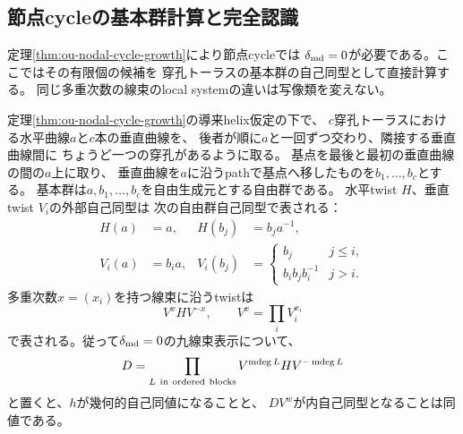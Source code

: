 \subsection{節点cycleの基本群計算と完全認識}
\label{subsec:ou-nodal-free-group}
定理\ref{thm:ou-nodal-cycle-growth}により節点cycleでは
$\delta_{\rm md}=0$が必要である。ここではその有限個の候補を
穿孔トーラスの基本群の自己同型として直接計算する。
同じ多重次数の線束のlocal systemの違いは写像類を変えない。

\begin{proposition}[基本群による幾何性の判定]
\label{prop:ou-nodal-free-group}
定理\ref{thm:ou-nodal-cycle-growth}の導来helix仮定の下で、
$c$穿孔トーラスにおける水平曲線$a$と$c$本の垂直曲線を、
後者が順に$a$と一回ずつ交わり、隣接する垂直曲線間に
ちょうど一つの穿孔があるように取る。
基点を最後と最初の垂直曲線の間の$a$上に取り、
垂直曲線を$a$に沿うpathで基点へ移したものを$b_1,\ldots,b_c$とする。
基本群は$a,b_1,\ldots,b_c$を自由生成元とする自由群である。
水平twist $H$、垂直twist $V_i$の外部自己同型は
次の自由群自己同型で表される：
\begin{align*}
 H(a)&=a,& H(b_j)&=b_j a^{-1},\\
 V_i(a)&=b_i a,&
 V_i(b_j)&=
 \begin{cases}b_j& j\leq i,\\b_i b_j b_i^{-1}& j>i.\end{cases}
\end{align*}
多重次数$x=(x_i)$を持つ線束に沿うtwistは
\[
 V^x H V^{-x},\qquad V^x=\prod_i V_i^{x_i}
\]
で表される。従って$\delta_{\rm md}=0$の九線束表示について、
\[
 D=\prod_{L\ {\rm in\ ordered\ blocks}} V^{\operatorname{mdeg} L}
                H V^{-\operatorname{mdeg} L}
\]
と置くと、$h$が幾何的自己同値になることと、
$DV^w$が内自己同型となることは同値である。
\end{proposition}
